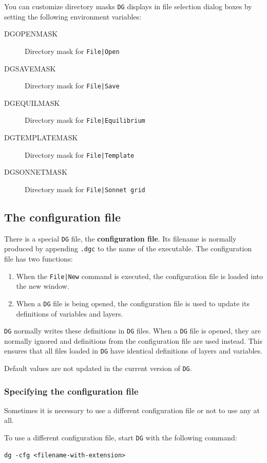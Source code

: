 \documentclass[a4paper,10pt]{report}
\begin{document}
You can customize directory masks {\tt DG} displays in file selection dialog
boxes by setting the following environment variables:
\begin{description}
\item[DGOPENMASK] Directory mask for {\tt File|Open}
\item[DGSAVEMASK] Directory mask for {\tt File|Save}
\item[DGEQUILMASK] Directory mask for {\tt File|Equilibrium}
\item[DGTEMPLATEMASK] Directory mask for {\tt File|Template}
\item[DGSONNETMASK] Directory mask for {\tt File|Sonnet grid}
\end{description}

\subsection{The configuration file}

There is a special {\tt DG} file, the {\bf configuration file}. Its
filename is normally produced by appending {\tt .dgc} to the name of the
executable. The configuration file has two functions:
\begin{enumerate}
  \item When the {\tt File|New} command is executed, the configuration file
is loaded into the new window.
  \item When a {\tt DG} file is being opened, the configuration file is used to
update its definitions of variables and layers.
\end{enumerate}

{\tt DG} normally writes these definitions in {\tt DG} files. When a {\tt DG} file is
opened, they are normally ignored and definitions from the
configuration file are used instead. This ensures that all files
loaded in {\tt DG} have identical definitions of layers and variables.

Default values are not updated in the current version of {\tt DG}.

\subsubsection{Specifying the configuration file}

Sometimes it is necessary to use a different configuration file or not
to use any at all.

To use a different configuration file, start {\tt DG} with the following
command:
\begin{verbatim}
dg -cfg <filename-with-extension>
\end{verbatim}
\end{document}
